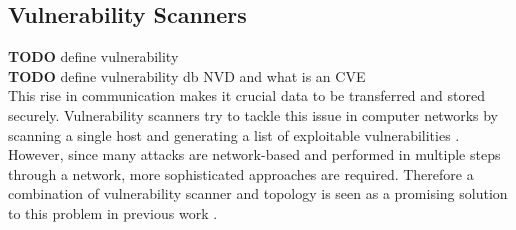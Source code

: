 \subsection{Vulnerability Scanners}
\label{chap:vulnerability_scanners}

\textbf{TODO}  define vulnerability \\
\textbf{TODO} define vulnerability db NVD and what is an CVE \\
This rise in communication makes it crucial data to be transferred and stored securely. Vulnerability scanners try to tackle this issue in computer networks by scanning a single host and generating a list of exploitable vulnerabilities \cite{deraison1999nessus, farmer1990cops, clair}. However, since many attacks are network-based and performed in multiple steps through a network, more sophisticated approaches are required. Therefore a combination of vulnerability scanner and topology is seen as a promising solution to this problem in previous work \cite{sheyner2002automated, ingols2006practical}.
